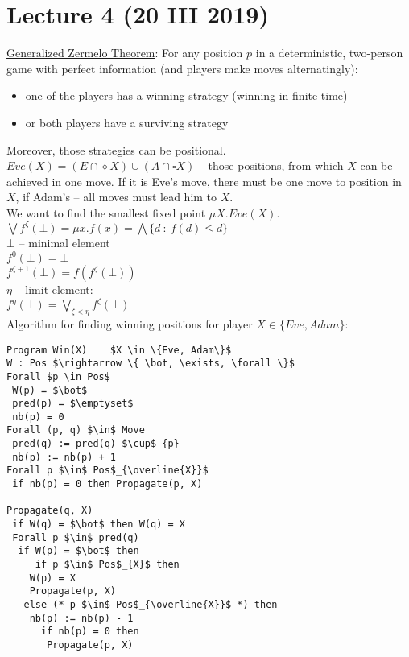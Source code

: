 \section{Lecture 4 (20 III 2019)}
\underline{Generalized Zermelo Theorem}: For any position $p$ in a deterministic, two-person game with perfect information (and players make moves alternatingly):
\begin{itemize}
  \item one of the players has a winning strategy (winning in finite time)
  \item or both players have a surviving strategy
\end{itemize}
Moreover, those strategies can be positional.\\
$Eve(X) = (E \cap \diamond X) \cup (A \cap \square X)$ -- those positions,
from which $X$ can be achieved in one move. If it is Eve's move, there must be
one move to position in $X$, if Adam's -- all moves must lead him to $X$.\\
We want to find the smallest fixed point $\mu X. Eve(X)$.\\
$\bigvee f^{\zeta}(\bot) = \mu x. f(x) = \bigwedge \{ d\ :\ f(d) \leq d\}$\\
$\bot$ -- minimal element\\
$f^0(\bot) = \bot$\\
$f^{\zeta + 1}(\bot) = f(f^{\zeta}(\bot))$\\
$\eta$ -- limit element:\\
$f^{\eta}(\bot) = \underset{\zeta < \eta}{\bigvee} f^{\zeta}(\bot)$\\

\noindent
Algorithm for finding winning positions for player $X \in \{Eve, Adam\}$:
\begin{lstlisting}[tabsize=2]
Program Win(X)    $X \in \{Eve, Adam\}$
W : Pos $\rightarrow \{ \bot, \exists, \forall \}$
Forall $p \in Pos$
 W(p) = $\bot$
 pred(p) = $\emptyset$
 nb(p) = 0
Forall (p, q) $\in$ Move
 pred(q) := pred(q) $\cup$ {p}
 nb(p) := nb(p) + 1
Forall p $\in$ Pos$_{\overline{X}}$
 if nb(p) = 0 then Propagate(p, X)

Propagate(q, X)
 if W(q) = $\bot$ then W(q) = X
 Forall p $\in$ pred(q)
  if W(p) = $\bot$ then
	 if p $\in$ Pos$_{X}$ then
    W(p) = X
    Propagate(p, X)
   else (* p $\in$ Pos$_{\overline{X}}$ *) then
    nb(p) := nb(p) - 1
	  if nb(p) = 0 then
	   Propagate(p, X)
\end{lstlisting}

